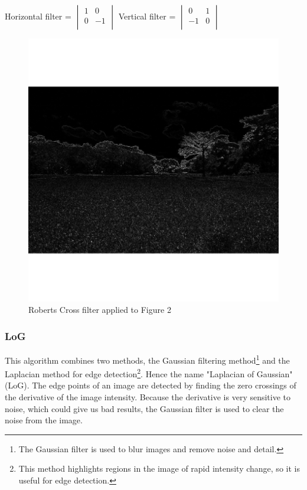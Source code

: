 \documentclass[12pt]{article}
\begin{document}
Horizontal filter = $\begin{vmatrix}
        1 & 0 \\
        0 & -1 \\
\end{vmatrix}$\hspace{11mm}
Vertical filter = $\begin{vmatrix}
        0 & 1\\
        -1 & 0\\
\end{vmatrix}$

\begin{figure}[h]
\centering
\includegraphics[scale = 0.45]{img/landscape_RobertsCross}
\caption{Roberts Cross filter applied to Figure 2}
\end{figure}
\newpage

\subsubsection{LoG}
This algorithm combines two methods, the Gaussian filtering method\footnote{The Gaussian filter is used to blur images and remove noise and detail.} and the Laplacian method for edge detection\footnote{This method highlights regions in the image of rapid intensity change, so it is useful for edge detection.}. Hence the name "Laplacian of Gaussian" (LoG).
The edge points of an image are detected by finding the zero crossings of the  derivative of the image intensity. Because the  derivative is very sensitive to noise, which could give us bad results, the Gaussian filter is used to clear the noise from the image. 
\newline
\end{document}
